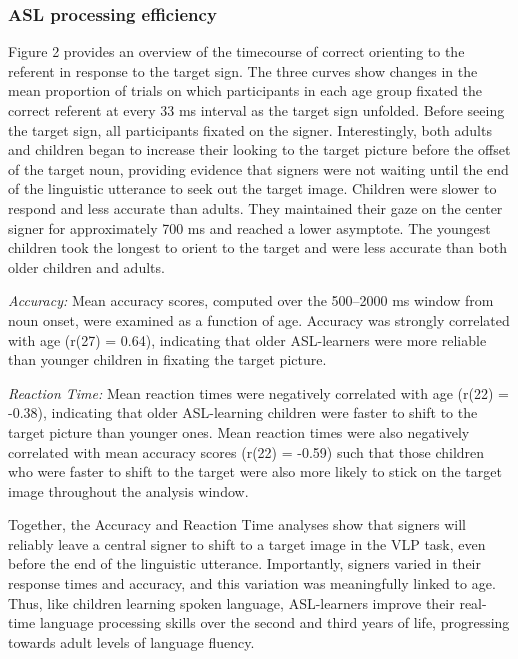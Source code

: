 \documentclass[12pt,]{article}
\begin{document}
\subsubsection{ASL processing
efficiency}\label{asl-processing-efficiency}

Figure 2 provides an overview of the timecourse of correct orienting to
the referent in response to the target sign. The three curves show
changes in the mean proportion of trials on which participants in each
age group fixated the correct referent at every 33 ms interval as the
target sign unfolded. Before seeing the target sign, all participants
fixated on the signer. Interestingly, both adults and children began to
increase their looking to the target picture before the offset of the
target noun, providing evidence that signers were not waiting until the
end of the linguistic utterance to seek out the target image. Children
were slower to respond and less accurate than adults. They maintained
their gaze on the center signer for approximately 700 ms and reached a
lower asymptote. The youngest children took the longest to orient to the
target and were less accurate than both older children and adults.

\emph{Accuracy:} Mean accuracy scores, computed over the 500--2000 ms
window from noun onset, were examined as a function of age. Accuracy was
strongly correlated with age (r(27) = 0.64), indicating that older
ASL-learners were more reliable than younger children in fixating the
target picture.

\emph{Reaction Time:} Mean reaction times were negatively correlated
with age (r(22) = -0.38), indicating that older ASL-learning children
were faster to shift to the target picture than younger ones. Mean
reaction times were also negatively correlated with mean accuracy scores
(r(22) = -0.59) such that those children who were faster to shift to the
target were also more likely to stick on the target image throughout the
analysis window.

Together, the Accuracy and Reaction Time analyses show that signers will
reliably leave a central signer to shift to a target image in the VLP
task, even before the end of the linguistic utterance. Importantly,
signers varied in their response times and accuracy, and this variation
was meaningfully linked to age. Thus, like children learning spoken
language, ASL-learners improve their real-time language processing
skills over the second and third years of life, progressing towards
adult levels of language fluency.
\end{document}
